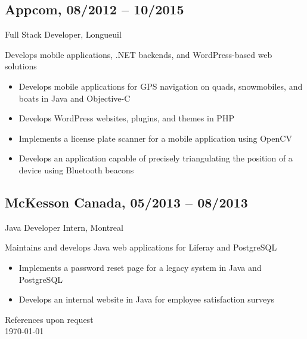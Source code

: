 \documentclass{article}
\begin{document}
\begin{paracol}{2}
\begin{rightcolumn}
    \vspace{1em}

    \subsection{Appcom, 08/2012 -- 10/2015}
    {Full Stack Developer, Longueuil\par}
    {
      Develops mobile applications, .NET backends, and WordPress-based web solutions
    \par}
    \begin{itemize}
      \item Develops mobile applications for GPS navigation on quads, snowmobiles, and boats in Java and Objective-C
      \item Develops WordPress websites, plugins, and themes in PHP
      \item Implements a license plate scanner for a mobile application using OpenCV
      \item Develops an application capable of precisely triangulating the position of a device using Bluetooth beacons
    \end{itemize}

    \vspace{1em}

    \subsection{McKesson Canada, 05/2013 -- 08/2013}
    {Java Developer Intern, Montreal\par}
    {
      Maintains and develops Java web applications for Liferay and PostgreSQL
    \par}
    \begin{itemize}
      \item Implements a password reset page for a legacy system in Java and PostgreSQL
      \item Develops an internal website in Java for employee satisfaction surveys
    \end{itemize}

    \vspace{3em}

    References upon request \\
    \today

    \flushpage

    \par\vfill

  \end{rightcolumn}
\end{paracol}
\end{document}

